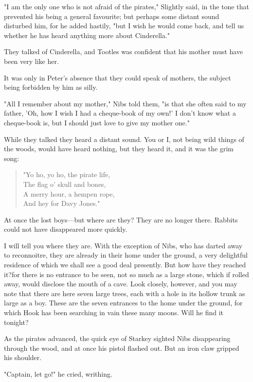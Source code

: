 "I am the only one who is not afraid of the pirates," Slightly said,
in the tone that prevented his being a general favourite;
but perhaps some distant sound disturbed him, for he added hastily,
"but I wish he would come back, and tell us whether he has heard anything more about Cinderella."

They talked of Cinderella, and Tootles was confident that his mother must have been very like her.

It was only in Peter's absence that they could speak of mothers,
the subject being forbidden by him as silly.

"All I remember about my mother," Nibs told them,
"is that she often said to my father, 'Oh, how I wish I had a cheque-book of my own!'
I don't know what a cheque-book is, but I should just love to give my mother one."

While they talked they heard a distant sound.
You or I, not being wild things of the woods, would have heard nothing,
but they heard it, and it was the grim song:

\begin{verse}
	"Yo ho, yo ho, the pirate life,\\
	The flag o' skull and bones,\\
	A merry hour, a hempen rope,\\
	And hey for Davy Jones."
\end{verse}

At once the lost boys—but where are they?
They are no longer there.
Rabbits could not have disappeared more quickly.

I will tell you where they are.
With the exception of Nibs, who has darted away to reconnoitre,
they are already in their home under the ground,
a very delightful residence of which we shall see a good deal presently.
But how have they reached it?\@ for there is no entrance to be seen,
not so much as a large stone, which if rolled away, would disclose the mouth of a cave.
Look closely, however, and you may note that there are here seven large trees,
each with a hole in its hollow trunk as large as a boy.
These are the seven entrances to the home under the ground,
for which Hook has been searching in vain these many moons.
Will he find it tonight?

As the pirates advanced, the quick eye of Starkey sighted Nibs disappearing through the wood,
and at once his pistol flashed out.
But an iron claw gripped his shoulder.

"Captain, let go!\@" he cried, writhing.

